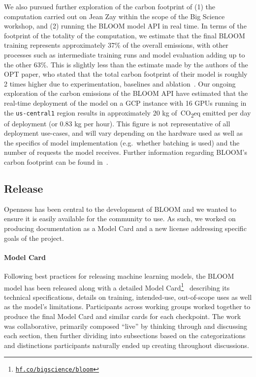 We also pursued further exploration of the carbon footprint of (1) the computation carried out on Jean Zay within the scope of the Big Science workshop, and (2) running the BLOOM model API in real time. In terms of the footprint of the totality of the computation, we estimate that the final BLOOM training represents approximately 37\% of the overall emissions, with other processes such as intermediate training runs and model evaluation adding up to the other 63\%. This is slightly less than the estimate made by the authors of the OPT paper, who stated that the total carbon footprint of their model is roughly 2 times higher due to experimentation, baselines and ablation~\citep{zhang2022opt}. Our ongoing exploration of the carbon emissions of the BLOOM API have estimated that the real-time deployment of the model on a GCP instance with 16 GPUs running in the \texttt{us-central1} region results in approximately 20 kg of~CO\textsubscript{2}eq emitted per day of deployment (or 0.83 kg per hour). This figure is not representative of all deployment use-cases, and will vary depending on the hardware used as well as the specifics of model implementation (e.g.\ whether batching is used) and the number of requests the model receives. Further information regarding BLOOM's carbon footprint can be found in~\cite{luccioni2022estimating}.

\subsection{Release}

Openness has been central to the development of BLOOM and we wanted to ensure it is easily available for the community to use. As such, we worked on producing documentation as a Model Card \citep{ModelCard} and a new license addressing specific goals of the project.

\paragraph{Model Card} Following best practices for releasing machine learning models, the BLOOM model has been released along with a detailed Model Card\footnote{\href{https://hf.co/bigscience/bloom}{\texttt{hf.co/bigscience/bloom}}}~\citep{ModelCard} describing its technical specifications, details on training, intended-use, out-of-scope uses as well as the model's limitations. Participants across working groups worked together to produce the final Model Card and similar cards for each checkpoint. The work was collaborative, primarily composed ``live'' by thinking through and discussing each section, then further dividing into subsections based on the categorizations and distinctions participants naturally ended up creating throughout discussions.

